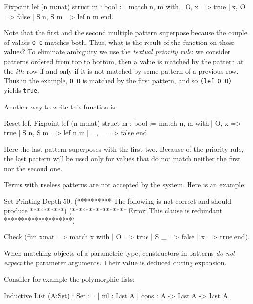 \begin{coq_example}
Fixpoint lef (n m:nat) {struct m} : bool :=
  match n, m with
  | O, x => true
  | x, O => false
  | S n, S m => lef n m
  end.
\end{coq_example}

Note that the first and the second multiple pattern superpose because
the couple of values \texttt{O O} matches both. Thus, what is the result
of the function on those values?  To eliminate ambiguity we use the
{\em textual priority rule}: we consider patterns ordered from top to
bottom, then a value is matched by the pattern at the $ith$ row if and
only if it is not matched by some pattern of a previous row. Thus in the
example,
\texttt{O O} is matched by the first pattern, and so \texttt{(lef O O)}
yields \texttt{true}.

Another way to write  this function is:

\begin{coq_example}
Reset lef.
Fixpoint lef (n m:nat) {struct m} : bool :=
  match n, m with
  | O, x => true
  | S n, S m => lef n m
  | _, _ => false
  end.
\end{coq_example}


Here the last pattern superposes with the first two. Because
of the priority rule, the last pattern 
will be used only for values that do not match neither the  first nor
the second one.  

Terms with useless patterns are not accepted by the
system. Here is an example:
\begin{coq_eval}
Set Printing Depth 50.
  (********** The following is not correct and should produce **********)
  (**************** Error: This clause is redundant ********************)
\end{coq_eval}
\begin{coq_example}
Check (fun x:nat =>
         match x with
         | O => true
         | S _ => false
         | x => true
         end).
\end{coq_example}

When matching objects of a parametric type, constructors in patterns
{\em do not expect} the parameter arguments. Their value is deduced
during expansion.

Consider for example the polymorphic lists:

\begin{coq_example}
Inductive List (A:Set) : Set :=
  | nil : List A
  | cons : A -> List A -> List A.
\end{coq_example}

